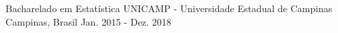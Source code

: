 \begin{cventries}
  \cvcompactentry
    {Bacharelado em Estatística}
    {UNICAMP - Universidade Estadual de Campinas}
    {Campinas, Brasil}
    {Jan. 2015 - Dez. 2018}
\end{cventries}


